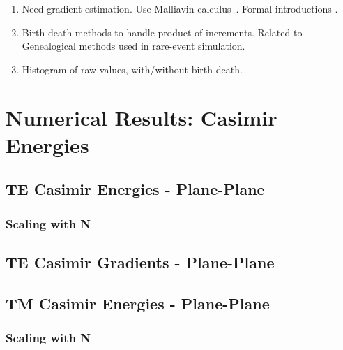     \begin{enumerate}
      \item Need gradient estimation.  Use Malliavin calculus~\cite{Fournie1999, Chen2007,Kohatsu-Higa2003}.
        Formal introductions \cite{Nualart2006, Malliavin2006, DiNunno2009}.
      \item Birth-death methods to handle product of increments.  Related to Genealogical 
        methods used in rare-event simulation.  
      \item Histogram of raw values, with/without birth-death.
    \end{enumerate}


\section{Numerical Results: Casimir Energies}

\subsection{TE Casimir Energies - Plane-Plane}


\subsubsection{Scaling with N}


\subsection{TE Casimir Gradients - Plane-Plane}




\subsection{TM Casimir Energies - Plane-Plane}

\subsubsection{Scaling with N}


    







